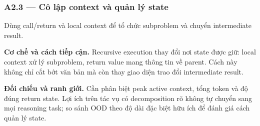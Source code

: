 \subsubsection*{A2.3 — Cô lập context và quản lý state}
Dùng call/return và local context để tổ chức subproblem và chuyển intermediate result.

\noindent\textbf{Cơ chế và cách tiếp cận.} Recursive execution thay đổi nơi state được giữ: local context xử lý subproblem, return value mang thông tin về parent. Cách này không chỉ cắt bớt văn bản mà còn thay giao diện trao đổi intermediate result.\par
\noindent\textbf{Đối chiếu và ranh giới.} Cần phân biệt peak active context, tổng token và độ đúng return state. Lợi ích trên tác vụ có decomposition rõ không tự chuyển sang mọi reasoning task; so sánh OOD theo độ dài đặc biệt hữu ích để đánh giá cách quản lý state.\par

